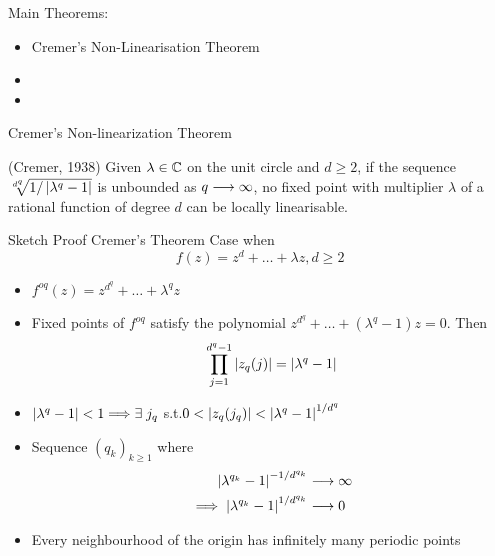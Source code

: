\begin{frame}
Main Theorems:
\begin{itemize}
    \item Cremer's Non-Linearisation Theorem
    \item {}
    \item {}
\end{itemize}
\end{frame}

\begin{frame}{Cremer's Non-linearization Theorem}
    \begin{thm}(Cremer, 1938) \label{thm: 11.2}
    Given $\lambda \in \mathbb{C}$ on the unit circle and $d \geq 2$, if the sequence $\sqrt[d^{q}]{1 / \left|\lambda^q - 1\right|}$ is unbounded as $q \longrightarrow \infty$, no fixed point with multiplier $\lambda$ of a rational function of degree $d$ can be locally linearisable.
\end{thm}
\end{frame}

\begin{frame}{Sketch Proof Cremer's Theorem}
Case when
\[
f(z) = z^{d} + \dots + \lambda z,  d \geq 2
\]
\begin{itemize}
    \item $f^{oq}(z) = z^{d^{q}} + \dots + \lambda^{q} z$
    \item Fixed points of $f^{oq}$ satisfy the polynomial $z^{d^{q}} + \dots + (\lambda^{q} - 1)z = 0$. Then 
    \[
    \prod_{j = 1}^{d^{q}-1} \left|{ z_{q}{(j)}}\right| = \left|\lambda^{q} - 1\right|
    \]
    \item $\left|\lambda^{q} - 1\right| < 1 \Longrightarrow \exists\; j_{q}$\; s.t.\;$ 0 < \left| z_{q}(j_q) \right| < \left|\lambda^{q} - 1\right|^{1/d^{q}}$
    \item Sequence $(q_{k})_{k\geq 1}$ where
    \begin{align*}
    \left|\lambda^{q_k} - 1\right|^{-1/d^{q_{k}}} &\longrightarrow \infty\\
    \implies \left|\lambda^{q_k} - 1\right|^{1/d^{q_{k}}} &\longrightarrow 0
    \end{align*}
    \item Every neighbourhood of the origin has infinitely many periodic points
\end{itemize}
\end{frame}


